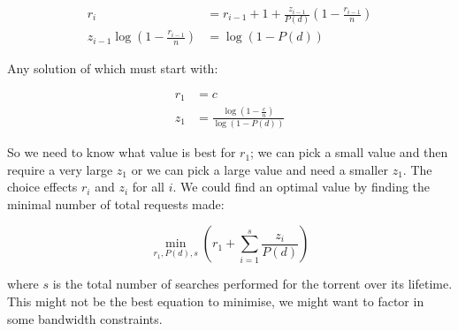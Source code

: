 \documentclass[12pt]{article}
\begin{document}
\begin{align}
    r_i &= r_{i-1} + 1 + \frac{z_{i-1}}{P(d)}(1-\frac{r_{i-1}}{n}) \\
    z_{i-1}\log(1 - \frac{r_{i-1}}{n}) &= \log(1-P(d))
\end{align}

Any solution of which must start with:

\begin{align}
    r_1 &= c \\
    z_1 &= \frac{\log(1 - \frac{c}{n})}{\log(1-P(d))}
\end{align}

So we need to know what value is best for $r_1$; we can pick a small value and then require a very large $z_1$ or we can pick a large value and need a smaller $z_1$. The choice effects $r_i$ and $z_i$ for all $i$. We could find an optimal value by finding the minimal number of total requests made:

\begin{equation}
    \min_{r_1,P(d),s}(r_1 + \sum_{i=1}^{s}\frac{z_i}{P(d)})
\end{equation}

where $s$ is the total number of searches performed for the torrent over its lifetime. This might not be the best equation to minimise, we might want to factor in some bandwidth constraints.
\end{document}
